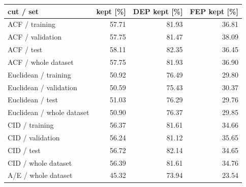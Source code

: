 \begin{tabular}{lrrr}
\hline
cut / set & kept [\%] & DEP kept [\%] & FEP kept [\%] \\
\hline
ACF / training & 57.71 & 81.93 & 36.81 \\
ACF / validation & 57.75 & 81.47 & 38.09 \\
ACF / test & 58.11 & 82.35 & 36.45 \\
ACF / whole dataset & 57.75 & 81.93 & 36.90 \\
Euclidean / training & 50.92 & 76.49 & 29.80 \\
Euclidean / validation & 50.59 & 75.43 & 30.37 \\
Euclidean / test & 51.03 & 76.29 & 29.76 \\
Euclidean / whole dataset & 50.90 & 76.37 & 29.85 \\
CID / training & 56.37 & 81.61 & 34.66 \\
CID / validation & 56.24 & 81.12 & 35.65 \\
CID / test & 56.72 & 82.14 & 34.65 \\
CID / whole dataset & 56.39 & 81.61 & 34.76 \\
A/E / whole dataset & 45.32 & 73.94 & 23.54 \\
\hline
\end{tabular}
